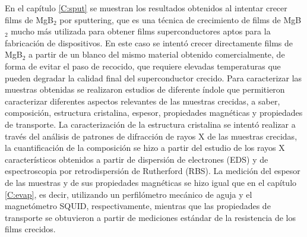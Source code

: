 En el capítulo \ref{C:sput} se muestran los resultados obtenidos al intentar crecer films de MgB$_{2}$ por sputtering, que es una técnica de crecimiento de films de MgB$_{2}$ mucho más utilizada para obtener films superconductores aptos para la fabricación de dispositivos. En este caso se intentó crecer directamente films de MgB$_2$ a partir de un blanco del mismo material obtenido comercialmente, de forma de evitar el paso de recocido, que requiere elevadas temperaturas que pueden degradar la calidad final del superconductor crecido. Para caracterizar las muestras obtenidas se realizaron estudios de diferente índole que permitieron caracterizar diferentes aspectos relevantes de las muestras crecidas, a saber, composición, estructura cristalina, espesor, propiedades magnéticas y propiedades de transporte. La caracterización de la estructura cristalina se intentó realizar a través del análisis de patrones de difracción de rayos X de las muestras crecidas, la cuantificación de la composición se hizo a partir del estudio de los rayos X característicos obtenidos a partir de dispersión de electrones (EDS) y de espectroscopia por retrodispersión de Rutherford (RBS). La medición del espesor de las muestras y de sus propiedades magnéticas se hizo igual que en el capítulo \ref{C:evap}, es decir, utilizando un perfilómetro mecánico de aguja y el magnetómetro SQUID, respectivamente, mientras que las propiedades de transporte se obtuvieron a partir de mediciones estándar de la resistencia de los films crecidos.
